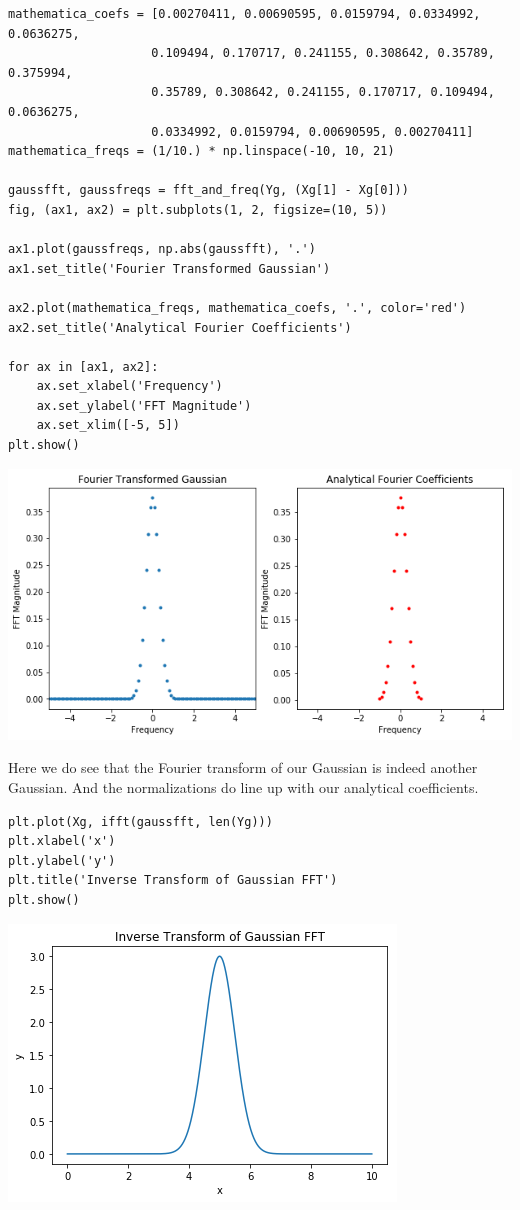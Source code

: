\documentclass[11pt]{article}
\begin{document}
\begin{verbatim}
mathematica_coefs = [0.00270411, 0.00690595, 0.0159794, 0.0334992, 0.0636275,
                    0.109494, 0.170717, 0.241155, 0.308642, 0.35789, 0.375994,
                    0.35789, 0.308642, 0.241155, 0.170717, 0.109494, 0.0636275,
                    0.0334992, 0.0159794, 0.00690595, 0.00270411]
mathematica_freqs = (1/10.) * np.linspace(-10, 10, 21)

gaussfft, gaussfreqs = fft_and_freq(Yg, (Xg[1] - Xg[0]))
fig, (ax1, ax2) = plt.subplots(1, 2, figsize=(10, 5))

ax1.plot(gaussfreqs, np.abs(gaussfft), '.')
ax1.set_title('Fourier Transformed Gaussian')

ax2.plot(mathematica_freqs, mathematica_coefs, '.', color='red')
ax2.set_title('Analytical Fourier Coefficients')

for ax in [ax1, ax2]:
    ax.set_xlabel('Frequency')
    ax.set_ylabel('FFT Magnitude')
    ax.set_xlim([-5, 5])
plt.show()
\end{verbatim}

\includegraphics[width=.9\linewidth]{./obipy-resources/333SQD.png}

Here we do see that the Fourier transform of our Gaussian is indeed another
Gaussian. And the normalizations do line up with our analytical coefficients.

\begin{verbatim}
plt.plot(Xg, ifft(gaussfft, len(Yg)))
plt.xlabel('x')
plt.ylabel('y')
plt.title('Inverse Transform of Gaussian FFT')
plt.show()
\end{verbatim}

\includegraphics[width=.9\linewidth]{./obipy-resources/3332rA.png}
\end{document}
